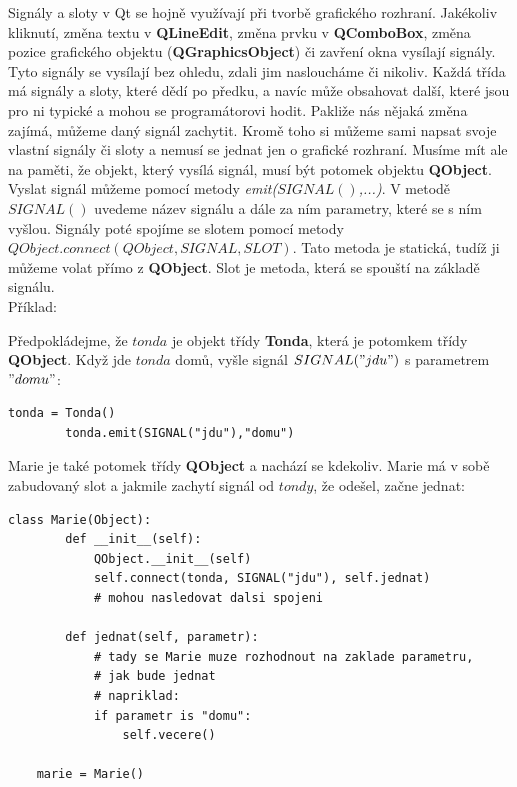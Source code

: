 Signály a sloty v Qt se hojně využívají při tvorbě grafického rozhraní. Jakékoliv kliknutí, změna textu v \textbf{QLineEdit}, změna prvku v \textbf{QComboBox}, změna pozice grafického objektu (\textbf{QGraphicsObject}) či zavření okna vysílají signály. Tyto signály se vysílají bez ohledu, zdali jim nasloucháme či nikoliv. Každá třída má signály a sloty, které dědí po předku, a navíc může obsahovat další, které jsou pro ni typické a mohou se programátorovi hodit. Pakliže nás nějaká změna zajímá, můžeme daný signál zachytit. Kromě toho si můžeme sami napsat svoje vlastní signály či sloty a nemusí se jednat jen o grafické rozhraní. Musíme mít ale na paměti, že objekt, který vysílá signál, musí být potomek objektu \textbf{QObject}. Vyslat signál můžeme  pomocí metody \textit{emit($SIGNAL()$,...)}. V metodě $SIGNAL()$ uvedeme název signálu a dále za ním parametry, které se s ním vyšlou. Signály poté spojíme se slotem pomocí metody $QObject.connect(QObject, SIGNAL, SLOT)$. Tato metoda je statická, tudíž ji můžeme volat přímo z \textbf{QObject}. Slot je metoda, která se spouští na základě signálu.  \\

\noindent Příklad:

Předpokládejme, že $tonda$ je objekt třídy \textbf{Tonda}, která je potomkem třídy \textbf{QObject}. Když jde $tonda$ domů, vyšle signál $SIGNAL("jdu")$ s parametrem $"domu"$: \\


\begin{lstlisting}[label=qtemit,caption={vyslání slotu pod názvem $"jdu"$ s atributem $"domu"$}]
		tonda = Tonda()
		tonda.emit(SIGNAL("jdu"),"domu")
\end{lstlisting}

Marie je také potomek třídy \textbf{QObject} a nachází se kdekoliv. Marie má v sobě zabudovaný slot a jakmile zachytí signál od $tondy$, že odešel, začne jednat: \\


\begin{lstlisting}[label=qtconnect,caption={zachycení signálu $"odesel"$ od tondy}, morekeywords={Marie, SIGNAL, QObject}]
	class Marie(Object):
		def __init__(self):
			QObject.__init__(self)
			self.connect(tonda, SIGNAL("jdu"), self.jednat)
			# mohou nasledovat dalsi spojeni
		
		def jednat(self, parametr):
			# tady se Marie muze rozhodnout na zaklade parametru, 
			# jak bude jednat
			# napriklad:
			if parametr is "domu":
				self.vecere()
		
	marie = Marie()
\end{lstlisting}


